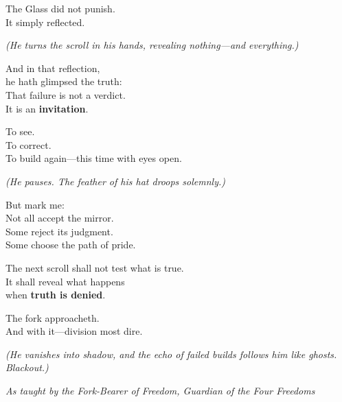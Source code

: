 The Glass did not punish.\\
It simply reflected.

\emph{(He turns the scroll in his hands, revealing nothing---and everything.)}

And in that reflection,\\
he hath glimpsed the truth:\\
That failure is not a verdict.\\
It is an \textbf{invitation}.

To see.\\
To correct.\\
To build again---this time with eyes open.

\emph{(He pauses. The feather of his hat droops solemnly.)}

But mark me:\\
Not all accept the mirror.\\
Some reject its judgment.\\
Some choose the path of pride.

The next scroll shall not test what is true.\\
It shall reveal what happens\\
when \textbf{truth is denied}.

The fork approacheth.\\
And with it---division most dire.

\emph{(He vanishes into shadow, and the echo of failed builds follows him like ghosts. Blackout.)}

\bookdivider

\emph{As taught by the Fork-Bearer of Freedom, Guardian of the Four Freedoms}

\bookdivider
